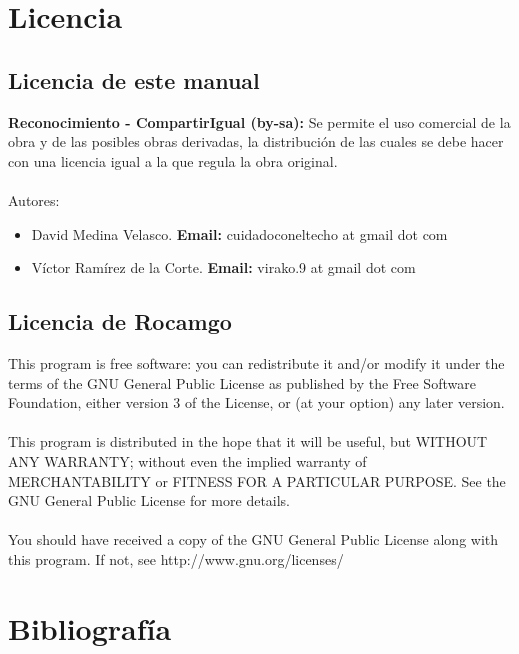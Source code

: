\documentclass[12pt,a4paper]{report}
\begin{document}
\chapter{Licencia}

\section{Licencia de este manual}

\textbf{Reconocimiento - CompartirIgual (by-sa):} Se permite el uso comercial de
la obra y de las posibles obras derivadas, la distribución de las cuales se debe
hacer con una licencia igual a la que regula la obra original. \\ \\


Autores: 
\begin{itemize} 
    \item David Medina Velasco. \textbf{Email:} cuidadoconeltecho at gmail dot
    com 
    \item Víctor Ramírez de la Corte. \textbf{Email:} virako.9 at gmail dot com 
\end{itemize}

\section{Licencia de Rocamgo}

This program is free software: you can redistribute it and/or modify it under
the terms of the GNU General Public License as published by the Free Software
Foundation, either version 3 of the License, or (at your option) any later
version. \\ \\ This program is distributed in the hope that it will be useful,
but WITHOUT ANY WARRANTY; without even the implied warranty of MERCHANTABILITY
or FITNESS FOR A PARTICULAR PURPOSE.  See the GNU General Public License for
more details. \\ \\ You should have received a copy of the GNU General Public
License along with this program.  If not, see http://www.gnu.org/licenses/



\chapter{Bibliografía}
\end{document}
